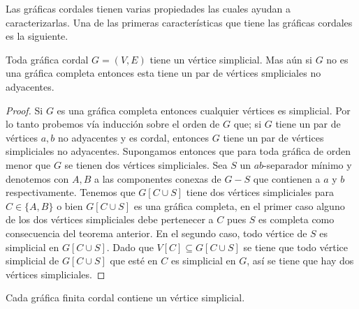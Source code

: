 Las gráficas cordales tienen varias propiedades las cuales ayudan a
caracterizarlas. Una de las primeras características que tiene las gráficas
cordales es la siguiente.

\begin{teorema}
\label{teo:103}
    Toda gráfica cordal $G=(V,E)$ tiene un vértice simplicial. Mas aún si $G$ no
    es una gráfica completa entonces esta tiene un par de vértices smpliciales
    no adyacentes.
\end{teorema}

\begin{proof}
    Si $G$ es una gráfica completa entonces cualquier vértices es simplicial.
    Por lo tanto probemos vía inducción sobre el orden de $G$ que; si $G$ tiene
    un par de vértices $a,b$ no adyacentes y es cordal, entonces $G$ tiene un
    par de vértices simpliciales no adyacentes. Supongamos entonces que para
    toda gráfica de orden menor que $G$ se tienen dos vértices simpliciales. Sea
    $S$ un $ab$-separador mínimo y denotemos con $A,B$ a las componentes conexas
    de $G-S$ que contienen a $a$ y $b$ respectivamente. Tenemos que $G[C \cup
    S]$ tiene dos vértices simpliciales para $C\in \{A,B\}$ o bien $G[C \cup S]$
    es una gráfica completa, en el primer caso alguno de los dos vértices
    simpliciales debe pertenecer a $C$ pues $S$ es completa como consecuencia
    del teorema anterior. En el segundo caso, todo vértice de $S$ es simplicial
    en $G[C \cup S]$. Dado que $V[C]\subseteq G[C \cup S]$ se tiene que todo
    vértice simplicial de $G[C \cup S]$ que esté en $C$ es simplicial en $G$,
    así se tiene que hay dos vértices simpliciales.
\end{proof}

\begin{teorema}
    Cada gráfica finita cordal contiene un vértice simplicial.
\end{teorema}

